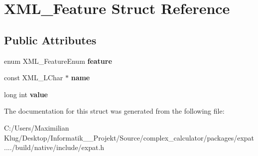 \hypertarget{struct_x_m_l___feature}{}\section{X\+M\+L\+\_\+\+Feature Struct Reference}
\label{struct_x_m_l___feature}
\subsection*{Public Attributes}
\begin{DoxyCompactItemize}
\item 
\mbox{\label{struct_x_m_l___feature_ae66421def7745a794da86612a9464b48}} 
enum X\+M\+L\+\_\+\+Feature\+Enum {\bfseries feature}
\item 
\mbox{\label{struct_x_m_l___feature_a0c69fbed3789a944a6c9168b1a6e5add}} 
const X\+M\+L\+\_\+\+L\+Char $\ast$ {\bfseries name}
\item 
\mbox{\label{struct_x_m_l___feature_a4d50cc5cb43a39f49435d0e81a4189dd}} 
long int {\bfseries value}
\end{DoxyCompactItemize}


The documentation for this struct was generated from the following file\+:\begin{DoxyCompactItemize}
\item 
C\+:/\+Users/\+Maximilian Klug/\+Desktop/\+Informatik\+\_\+\_\+\+Projekt/\+Source/complex\+\_\+calculator/packages/expat..../build/native/include/expat.\+h\end{DoxyCompactItemize}
